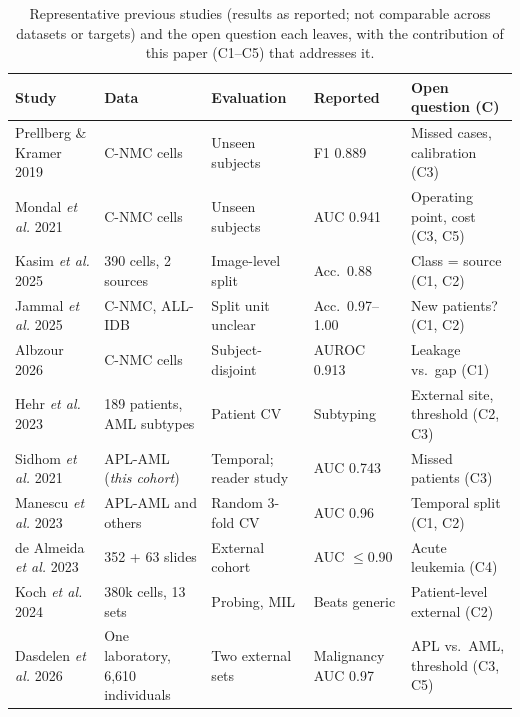 \documentclass[journal]{IEEEtran}
\begin{document}
\begin{table}[!t]
\centering
\caption{Representative previous studies (results as reported; not comparable across datasets or targets) and the open question each leaves, with the contribution of this paper (C1--C5) that addresses it.}
\label{tab:survey}
\setlength{\tabcolsep}{4pt}
\renewcommand{\arraystretch}{1.1}
\small
\begin{tabular}{p{3.0cm}p{3.6cm}p{3.6cm}p{2.6cm}p{4.6cm}}
\toprule
Study & Data & Evaluation & Reported & Open question (C) \\
\midrule
Prellberg \& Kramer 2019 \cite{prellberg2019cnmc} & C-NMC cells & Unseen subjects & F1 0.889 & Missed cases, calibration (C3) \\
Mondal \emph{et al.} 2021 \cite{mondal2021ensemble} & C-NMC cells & Unseen subjects & AUC 0.941 & Operating point, cost (C3, C5) \\
Kasim \emph{et al.} 2025 \cite{kasim2025multiclass} & 390 cells, 2 sources & Image-level split & Acc.\ 0.88 & Class = source (C1, C2) \\
Jammal \emph{et al.} 2025 \cite{jammal2025causalformer,jammal2025neurobridge} & C-NMC, ALL-IDB & Split unit unclear & Acc.\ 0.97--1.00 & New patients? (C1, C2) \\
Albzour 2026 \cite{albzour2026leakage} & C-NMC cells & Subject-disjoint & AUROC 0.913 & Leakage vs.\ gap (C1) \\
Hehr \emph{et al.} 2023 \cite{hehr2023scemila} & 189 patients, AML subtypes & Patient CV & Subtyping & External site, threshold (C2, C3) \\
Sidhom \emph{et al.} 2021 \cite{sidhom2021apl} & APL-AML (\emph{this cohort}) & Temporal; reader study & AUC 0.743 & Missed patients (C3) \\
Manescu \emph{et al.} 2023 \cite{manescu2023apl} & APL-AML and others & Random 3-fold CV & AUC 0.96 & Temporal split (C1, C2) \\
de Almeida \emph{et al.} 2023 \cite{dealmeida2023haemorasis} & 352 + 63 slides & External cohort & AUC $\le$0.90 & Acute leukemia (C4) \\
Koch \emph{et al.} 2024 \cite{koch2024dinobloom} & 380k cells, 13 sets & Probing, MIL & Beats generic & Patient-level external (C2) \\
Dasdelen \emph{et al.} 2026 \cite{dasdelen2026caitomorph} & One laboratory, 6,610 individuals & Two external sets & Malignancy AUC 0.97 & APL vs.\ AML, threshold (C3, C5) \\
\bottomrule
\end{tabular}
\end{table}
\end{document}
